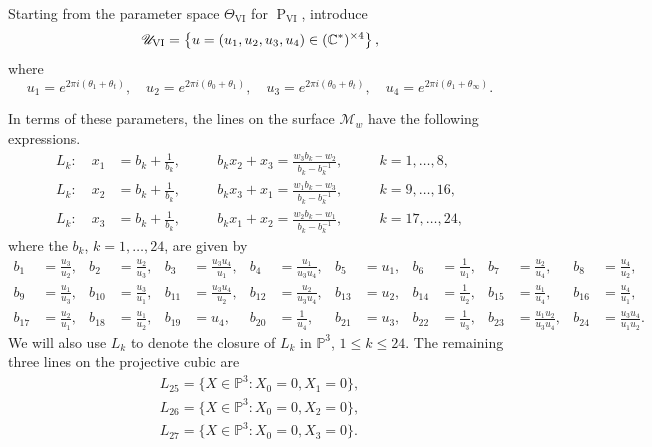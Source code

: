 \documentclass[a4paper,reqno]{amsart}
\numberwithin{equation}{section}
\newcommand{\C}{\mathbb{C}}
\newcommand{\pain}[1]{\operatorname{P}_{\mathrm{#1}}}
\numberwithin{equation}{section}
\begin{document}
Starting from the parameter space $\Theta_{\mathrm{VI}}$ for $\pain{VI}$, introduce  
$$\mathscr{U}_{\rm{VI}} = \left\{ u=(u_1,u_2,u_3,u_4)\in (\C^*)^{\times 4} \right\},$$
where 
\begin{equation}\label{eq:pvitheta_to_u}
 u_1 = e^{2\pi i(\theta_1+\theta_t)}, 
\quad  u_2 = e^{2\pi i(\theta_0+\theta_1)},
\quad  u_3 = e^{2\pi i(\theta_0+\theta_t)},
\quad  u_4 = e^{2\pi i(\theta_1+\theta_{\infty})}.   
\end{equation}


In terms of these parameters, the lines on the surface $\mathcal{M}_w$ have the following expressions.
\begin{equation}\label{eq:linesPVI}
\begin{aligned}
    L_k : \quad x_1 &= b_k+\frac{1}{b_k},\quad &&b_k x_2+x_3=\frac{w_3b_k-w_2}{b_k-b_k^{-1}}, \quad &&k=1,\dots,8, \\
    L_k :\quad  x_2 &= b_k+\frac{1}{b_k},\quad &&b_k x_3+x_1=\frac{w_1b_k-w_3}{b_k-b_k^{-1}}, \quad &&k=9,\dots,16, \\
    L_k : \quad x_3 &= b_k+\frac{1}{b_k},\quad &&b_k x_1+x_2=\frac{w_2b_k-w_1}{b_k-b_k^{-1}}, \quad &&k=17,\dots,24, 
\end{aligned}
\end{equation}
where the $b_k$, $k=1,\dots,24$, are given by
\begin{equation}\label{eq:defbpvi}
\begin{aligned}
    b_1 &= \frac{u_3}{u_2}, &
    b_2 &= \frac{u_2}{u_3}, &
    b_3 &= \frac{u_3u_4}{u_1}, &
    b_4 &= \frac{u_1}{u_3u_4}, &
    b_5 &= u_1, &
    b_6 &= \frac{1}{u_1}, &
    b_7 &= \frac{u_2}{u_4}, &
    b_8 &= \frac{u_4}{u_2},\\
    b_9 &= \frac{u_1}{u_3}, &
    b_{10} &= \frac{u_3}{u_1}, &
    b_{11} &= \frac{u_3u_4}{u_2}, &
    b_{12} &= \frac{u_2}{u_3u_4}, &
    b_{13} &= u_2, &
    b_{14} &= \frac{1}{u_2}, &
    b_{15} &= \frac{u_1}{u_4}, &
    b_{16} &= \frac{u_4}{u_1},\\
    b_{17} &= \frac{u_2}{u_1}, &
    b_{18} &= \frac{u_1}{u_2}, &
    b_{19} &= u_4, &
    b_{20} &= \frac{1}{u_4}, &
    b_{21} &= u_3, &
    b_{22} &= \frac{1}{u_3}, &
    b_{23} &= \frac{u_1u_2}{u_3u_4}, &
    b_{24} &= \frac{u_3u_4}{u_1u_2}.
\end{aligned}
\end{equation}
We will also use $L_k$ to denote the closure of $L_k$ in $\mathbb{P}^3$, $1\leq k\leq 24$. The remaining three lines on the projective cubic are
\begin{equation*}
\begin{aligned}
    L_{25}=\{X\in\mathbb{P}^3 : X_0=0,X_1=0\},\\
    L_{26}=\{X\in\mathbb{P}^3 : X_0=0,X_2=0\},\\
    L_{27}=\{X\in\mathbb{P}^3 : X_0=0,X_3=0\}.
\end{aligned}
\end{equation*}
\end{document}

